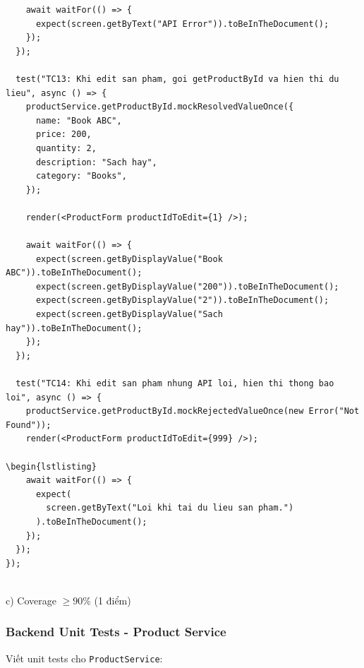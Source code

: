 \documentclass[a4paper,12pt]{article}
\begin{document}
\begin{tcolorbox}[breakable, colback=green!5,colframe=black!50,title=ProductForm.test.js]
\begin{lstlisting}
    await waitFor(() => {
      expect(screen.getByText("API Error")).toBeInTheDocument();
    });
  });

  test("TC13: Khi edit san pham, goi getProductById va hien thi du lieu", async () => {
    productService.getProductById.mockResolvedValueOnce({
      name: "Book ABC",
      price: 200,
      quantity: 2,
      description: "Sach hay",
      category: "Books",
    });

    render(<ProductForm productIdToEdit={1} />);

    await waitFor(() => {
      expect(screen.getByDisplayValue("Book ABC")).toBeInTheDocument();
      expect(screen.getByDisplayValue("200")).toBeInTheDocument();
      expect(screen.getByDisplayValue("2")).toBeInTheDocument();
      expect(screen.getByDisplayValue("Sach hay")).toBeInTheDocument();
    });
  });

  test("TC14: Khi edit san pham nhung API loi, hien thi thong bao loi", async () => {
    productService.getProductById.mockRejectedValueOnce(new Error("Not Found"));
    render(<ProductForm productIdToEdit={999} />);

\begin{lstlisting}
    await waitFor(() => {
      expect(
        screen.getByText("Loi khi tai du lieu san pham.")
      ).toBeInTheDocument();
    });
  });
});


\end{lstlisting}
\end{tcolorbox}
c) Coverage $\geq 90\%$ (1 điểm)



\subsubsection{Backend Unit Tests - Product Service}

Viết unit tests cho \texttt{ProductService}:
\end{document}
